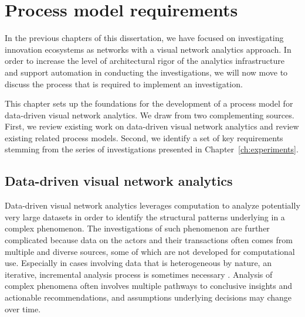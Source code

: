 \chapter{Process model requirements}
\label{ch:processmodels}

In the previous chapters of this dissertation, we have focused on investigating innovation ecosystems as networks with a visual network analytics approach. In order to increase the level of architectural rigor of the analytics infrastructure and support automation in conducting the investigations, we will now move to discuss the process that is required to implement an investigation.

This chapter sets up the foundations for the development of a process model for data-driven visual network analytics. We draw from two complementing sources. First, we review existing work on data-driven visual network analytics and review existing related process models. Second, we identify a set of key requirements stemming from the series of investigations presented in Chapter~\ref{ch:experiments}.

\section{Data-driven visual network analytics}

Data-driven visual network analytics leverages computation to analyze potentially very large datasets in order to identify the structural patterns underlying in a complex phenomenon. The investigations of such phenomenon are further complicated because data on the actors and their transactions often comes from multiple and diverse sources, some of which are not developed for computational use. Especially in cases involving data that is heterogeneous by nature, an iterative, incremental analysis process is sometimes necessary \citep{Telea2008}. Analysis of complex phenomena often involves multiple pathways to conclusive insights and actionable recommendations, and assumptions underlying decisions may change over time.

